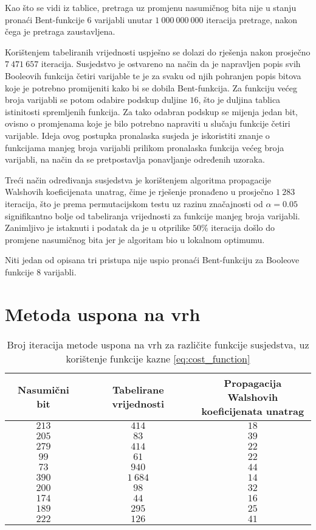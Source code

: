 Kao što se vidi iz tablice, pretraga uz promjenu nasumičnog bita nije u stanju pronaći Bent-funkcije $6$ varijabli unutar $1\:000\:000\:000$ iteracija pretrage, nakon čega je pretraga zaustavljena.

Korištenjem tabeliranih vrijednosti uspješno se dolazi do rješenja nakon prosječno $7\:471\:657$ iteracija.
Susjedstvo je ostvareno na način da je napravljen popis svih Booleovih funkcija četiri varijable te je za svaku od njih pohranjen popis bitova koje je potrebno promijeniti kako bi se dobila Bent-funkcija.
Za funkciju većeg broja varijabli se potom odabire podskup duljine $16$, što je duljina tablica istinitosti spremljenih funkcija.
Za tako odabran podskup se mijenja jedan bit, ovisno o promjenama koje je bilo potrebno napraviti u slučaju funkcije četiri varijable.
Ideja ovog postupka pronalaska susjeda je iskoristiti znanje o funkcijama manjeg broja varijabli prilikom pronalaska funkcija većeg broja varijabli, na način da se pretpostavlja ponavljanje određenih uzoraka.

Treći način određivanja susjedstva je korištenjem algoritma propagacije Walshovih koeficijenata unatrag, čime je rješenje pronađeno u prosječno $1\:283$ iteracija, što je prema permutacijskom testu uz razinu značajnosti od $\alpha = 0.05$ signifikantno bolje od tabeliranja vrijednosti za funkcije manjeg broja varijabli.
Zanimljivo je istaknuti i podatak da je u otprilike $50\%$ iteracija došlo do promjene nasumičnog bita jer je algoritam bio u lokalnom optimumu.

Niti jedan od opisana tri pristupa nije uspio pronaći Bent-funkciju za Booleove funkcije $8$ varijabli.

\section{Metoda uspona na vrh}
\begin{table}[]
    \centering
    \begin{tabular}{ccc}
        Nasumični bit & Tabelirane vrijednosti & \makecell{Propagacija Walshovih \\ koeficijenata unatrag} \\ \hline
        $213$ &    $414$ & $18$ \\
        $205$ &     $83$ & $39$ \\
        $279$ &    $414$ & $22$ \\
         $99$ &     $61$ & $22$ \\
         $73$ &    $940$ & $44$ \\
        $390$ & $1\:684$ & $14$ \\
        $200$ &     $98$ & $32$ \\
        $174$ &     $44$ & $16$ \\
        $189$ &    $295$ & $25$ \\
        $222$ &    $126$ & $41$
    \end{tabular}
    \captionsetup{justification=centering}
    \caption{Broj iteracija metode uspona na vrh za različite funkcije susjedstva, uz korištenje funkcije kazne \eqref{eq:cost_function}}
    \label{tbl:greedy_6}
\end{table}

